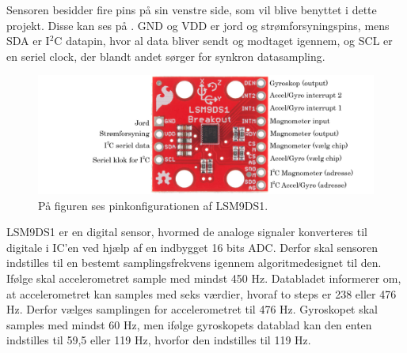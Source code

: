 Sensoren besidder fire pins på sin venstre side, som vil blive benyttet i dette projekt. Disse kan ses på . GND og VDD er jord og strømforsyningspins, mens SDA er I$^2$C datapin, hvor al data bliver sendt og modtaget igennem, og SCL er en seriel clock, der blandt andet sørger for synkron datasampling.
\begin{figure}[H]
	\centering
	\includegraphics[scale=0.35]{figures/cDesign/accelerometeret.png}
	\caption{På figuren ses pinkonfigurationen af LSM9DS1. \citep{Jimb02016}}
	\label{fig:IC_pins}
\end{figure}
LSM9DS1 er en digital sensor, hvormed de analoge signaler konverteres til digitale i IC'en ved hjælp af en indbygget 16 bits ADC. Derfor skal sensoren indstilles til en bestemt samplingsfrekvens igennem algoritmedesignet til den. Ifølge  skal accelerometret sample med mindst 450 Hz. Databladet informerer om, at accelerometret kan samples med seks værdier, hvoraf to steps er 238 eller 476 Hz. Derfor vælges samplingen for accelerometret til 476 Hz. Gyroskopet skal samples med mindst 60 Hz, men ifølge gyroskopets datablad kan den enten indstilles til 59,5 eller 119 Hz, hvorfor den indstilles til 119 Hz.

